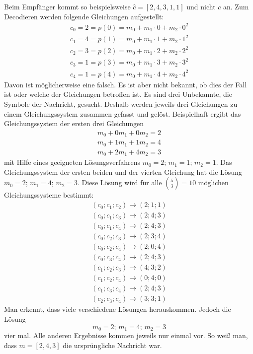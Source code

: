 Beim Empfänger kommt so beispielsweise $\hat{c}=[2,4,3,1,1]$ und nicht $c$ an.
Zum Decodieren werden folgende Gleichungen aufgestellt:
\begin{gather}
c_0=2=p(0)=m_0+m_1\cdot0+m_2\cdot0^2 \nonumber\\
c_1=4=p(1)=m_0+m_1\cdot1+m_2\cdot1^2 \nonumber\\
c_2=3=p(2)=m_0+m_1\cdot2+m_2\cdot2^2 \nonumber\\
c_3=1=p(3)=m_0+m_1\cdot3+m_2\cdot3^2 \nonumber\\
c_4=1=p(4)=m_0+m_1\cdot4+m_2\cdot4^2 \nonumber
\end{gather}
Davon ist möglicherweise eine falsch. 
Es ist aber nicht bekannt, ob dies der Fall ist oder welche der Gleichungen betroffen ist.
Es sind drei Unbekannte, die Symbole der Nachricht, gesucht.
Deshalb werden jeweils drei Gleichungen zu einem Gleichungssystem zusammen gefasst und gelöst.
Beispielhaft ergibt das Gleichungssystem der ersten drei Gleichungen
\begin{gather}
m_0+0m_1+0m_2=2 \nonumber\\
m_0+1m_1+1m_2=4 \nonumber\\
m_0+2m_1+4m_2=3 \nonumber
\end{gather}
mit Hilfe eines geeigneten Lösungsverfahrens $m_0=2$; $m_1=1$; $m_2=1$.
Das Gleichungssystem der ersten beiden und der vierten Gleichung hat die Lösung $m_0=2$; $m_1=4$; $m_2=3$.
Diese Lösung wird für alle $\binom{5}{3}=10$ möglichen Gleichungssysteme bestimmt: 
\begin{gather}
(c_0; c_1; c_2)\rightarrow(2;1;1) \nonumber\\
(c_0; c_1; c_3)\rightarrow(2;4;3) \nonumber\\
(c_0; c_1; c_4)\rightarrow(2;4;3) \nonumber\\
(c_0; c_2; c_3)\rightarrow(2;3;4) \nonumber\\
(c_0; c_2; c_4)\rightarrow(2;0;4) \nonumber\\
(c_0; c_3; c_4)\rightarrow(2;4;3) \nonumber\\
(c_1; c_2; c_3)\rightarrow(4;3;2) \nonumber\\
(c_1; c_2; c_4)\rightarrow(0;4;0) \nonumber\\
(c_1; c_3; c_4)\rightarrow(2;4;3) \nonumber\\
(c_2; c_3; c_4)\rightarrow(3;3;1) \nonumber
\end{gather}
Man erkennt, dass viele verschiedene Lösungen herauskommen.
Jedoch die Lösung \[m_0=2;\,m_1=4;\,m_2=3\] vier mal.
Alle anderen Ergebnisse kommen jeweils nur einmal vor.
So weiß man, dass $m=[2,4,3]$ die ursprüngliche Nachricht war.

